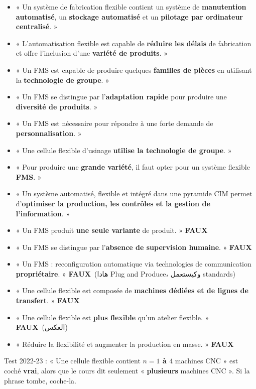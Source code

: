 \documentclass[11pt,a4paper]{article}
\newcommand{\ar}[1]{\textarabic{#1}}
\newcommand{\fr}[1]{\textfrench{#1}}
\newcommand{\faux}{\textcolor{rouge}{\textbf{FAUX}}}
\begin{document}
\begin{examen}
\begin{itemize}
\item « Un système de fabrication flexible contient un système de \textbf{manutention automatisé}, un \textbf{stockage automatisé} et un \textbf{pilotage par ordinateur centralisé}. »
\item « L'automatisation flexible est capable de \textbf{réduire les délais} de fabrication et offre l'inclusion d'une \textbf{variété de produits}. »
\item « Un FMS est capable de produire quelques \textbf{familles de pièces} en utilisant la \textbf{technologie de groupe}. »
\item « Un FMS se distingue par l'\textbf{adaptation rapide} pour produire une \textbf{diversité de produits}. »
\item « Un FMS est nécessaire pour répondre à une forte demande de \textbf{personnalisation}. »
\item « Une cellule flexible d'usinage \textbf{utilise la technologie de groupe}. »
\item « Pour produire une \textbf{grande variété}, il faut opter pour un système flexible \textbf{FMS}. »
\item « Un système automatisé, flexible et intégré dans une pyramide CIM permet d'\textbf{optimiser la production, les contrôles et la gestion de l'information}. »
\end{itemize}
\end{examen}
\begin{piege}
\begin{itemize}
\item « Un FMS produit \textbf{une seule variante} de produit. » \faux
\item « Un FMS se distingue par l'\textbf{absence de supervision humaine}. » \faux
\item « Un FMS : reconfiguration automatique via technologies de communication \textbf{propriétaire}. » \faux \ \ar{(هادا \fr{Plug and Produce}، وكيستعمل \fr{standards})}
\item « Une cellule flexible est composée de \textbf{machines dédiées et de lignes de transfert}. » \faux
\item « Une cellule flexible est \textbf{plus flexible} qu'un atelier flexible. » \faux \ \ar{(العكس)}
\item « Réduire la flexibilité et augmenter la production en masse. » \faux
\end{itemize}
\end{piege}
\begin{alerte}
Test 2022-23 : « Une cellule flexible contient \textbf{$n=1$ à $4$} machines CNC » est coché \textbf{vrai}, alors que le cours dit seulement « \textbf{plusieurs} machines CNC ». Si la phrase tombe, coche-la.
\end{alerte}
\end{document}
